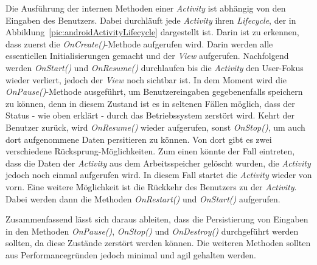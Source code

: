 Die Ausführung der internen Methoden einer \textit{Activity} ist abhängig von den Eingaben des Benutzers. Dabei durchläuft jede \textit{Activity} ihren \textit{Lifecycle}, der in Abbildung~\ref{pic:androidActivityLifecycle} dargestellt ist. Darin ist zu erkennen, dass zuerst die \textit{OnCreate()}-Methode aufgerufen wird. Darin werden alle essentiellen Initialisierungen gemacht und der \textit{View} aufgerufen. Nachfolgend werden \textit{OnStart()} und \textit{OnResume()} durchlaufen bis die \textit{Activity} den User-Fokus wieder verliert, jedoch der \textit{View} noch sichtbar ist. In dem Moment wird die \textit{OnPause()}-Methode ausgeführt, um Benutzereingaben gegebenenfalls speichern zu können, denn in diesem Zustand ist es in seltenen Fällen möglich, dass der Status - wie oben erklärt - durch das Betriebssystem zerstört wird. Kehrt der Benutzer zurück, wird \textit{OnResume()} wieder aufgerufen, sonst \textit{OnStop()}, um auch dort aufgenommene Daten persitieren zu können. Von dort gibt es zwei verschiedene Rücksprung-Möglichkeiten. Zum einen könnte der Fall eintreten, dass die Daten der \textit{Activity} aus dem Arbeitsspeicher gelöscht wurden, die \textit{Activity} jedoch noch einmal aufgerufen wird. In diesem Fall startet die \textit{Activity} wieder von vorn. Eine weitere Möglichkeit ist die Rückkehr des Benutzers zu der \textit{Activity}. Dabei werden dann die Methoden \textit{OnRestart()} und \textit{OnStart()} aufgerufen.

Zusammenfassend lässt sich daraus ableiten, dass die Persistierung von Eingaben in den Methoden \textit{OnPause()}, \textit{OnStop()} und \textit{OnDestroy()} durchgeführt werden sollten, da diese Zustände zerstört werden können. Die weiteren Methoden sollten aus Performancegründen jedoch minimal und agil gehalten werden.

